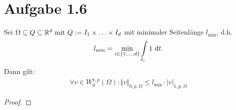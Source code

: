\documentclass[12pt,a4paper]{article}
\begin{document}
\section*{Aufgabe 1.6}
Sei $\Omega\subseteq Q\subseteq\mathbb{R}^d\text{ mit } Q:=I_1\times\ldots\times I_d$ mit minimaler Seitenlänge $l_{\min}$, d.h.
\begin{align*}
l_{\min}=\min\limits_{i\in\lbrace1,\ldots,d\rbrace}\int\limits_{I_i} 1\text{ d} t.
\end{align*}
Dann gilt:
\begin{align*}
\forall v\in W_0^{1,p}(\Omega):\Vert v\Vert_{0,p,\Omega}\leq l_{\min}\cdot|v|_{1,p,\Omega}
\end{align*}
\begin{proof}

\end{proof}
\end{document}
